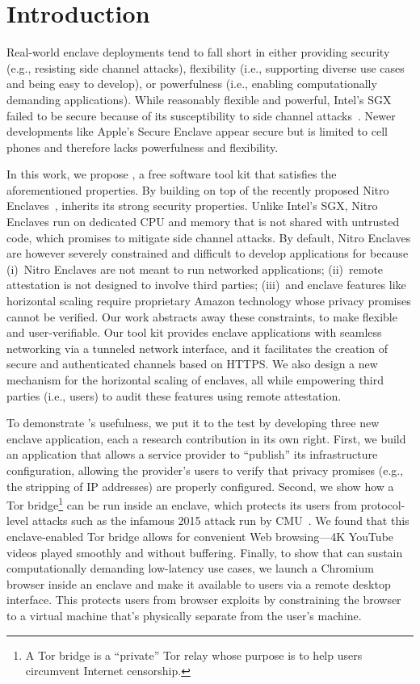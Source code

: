 \section{Introduction}

Real-world enclave deployments tend to fall short in either providing security
(e.g., resisting side channel attacks), flexibility (i.e., supporting diverse
use cases and being easy to develop), or powerfulness (i.e., enabling
computationally demanding applications).  While reasonably flexible and
powerful, Intel's SGX failed to be secure because of its susceptibility to side
channel attacks~\cite{VanBulck2018a,Murdock2020a,Brasser2017a}.  Newer
developments like Apple's Secure Enclave appear secure but is limited to cell
phones and therefore lacks powerfulness and flexibility.

In this work, we propose \tool{}, a free software tool kit that satisfies the
aforementioned properties.  By building on top of the recently proposed Nitro
Enclaves~\cite{nitro-enclaves}, \tool{} inherits its strong security properties.
Unlike Intel's SGX, Nitro Enclaves run on dedicated CPU and memory that is not
shared with untrusted code, which promises to mitigate side channel attacks.
%
By default, Nitro Enclaves are however severely constrained and difficult to
develop applications for because (i)~Nitro Enclaves are not meant to run
networked applications; (ii)~remote attestation is not designed to involve third
parties; (iii)~and enclave features like horizontal scaling require proprietary
Amazon technology whose privacy promises cannot be verified.  Our work abstracts
away these constraints, to make \tool{} flexible and user-verifiable.  Our tool
kit provides enclave applications with seamless networking via a tunneled
network interface, and it facilitates the creation of secure and authenticated
channels based on HTTPS.  We also design a new mechanism for the horizontal
scaling of enclaves, all while empowering third parties (i.e., users) to audit
these features using remote attestation.

To demonstrate \tool{}'s usefulness, we put it to the test by developing three
new enclave application, each a research contribution in its own right.
%
First, we build an application that allows a service provider to ``publish'' its
infrastructure configuration, allowing the provider's users to verify that
privacy promises (e.g., the stripping of IP addresses) are properly configured.
%
Second, we show how a Tor bridge\footnote{A Tor bridge is a ``private'' Tor
relay whose purpose is to help users circumvent Internet censorship.}
can be run inside an enclave, which protects its users from protocol-level
attacks such as the infamous 2015 attack run by CMU~\cite{Dingledine2015a}.
We found that this enclave-enabled Tor bridge allows for convenient Web
browsing---4K YouTube videos played smoothly and without buffering.
%
Finally, to show that \tool{} can sustain computationally demanding low-latency
use cases, we launch a Chromium browser inside an enclave and make it available
to users via a remote desktop interface.  This protects users from browser
exploits by constraining the browser to a virtual machine that's physically
separate from the user's machine.

